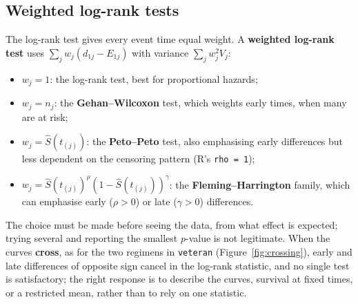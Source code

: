 \documentclass[11pt,a4paper]{article}
\numberwithin{equation}{section}
\theoremstyle{definition}
\begin{document}
\subsection{Weighted log-rank tests}
\label{ssec:weighted}

The log-rank test gives every event time equal weight. A \textbf{weighted log-rank test} uses $\sum_jw_j(d_{1j} - E_{1j})$ with variance $\sum_jw_j^2V_j$:
\begin{itemize}
\item $w_j = 1$: the log-rank test, best for proportional hazards;
\item $w_j = n_j$: the \textbf{Gehan--Wilcoxon} test, which weights early times, when many are at risk;
\item $w_j = \hat S(t_{(j)})$: the \textbf{Peto--Peto} test, also emphasising early differences but less dependent on the censoring pattern (R's \texttt{rho = 1});
\item $w_j = \hat S(t_{(j)})^\rho(1 - \hat S(t_{(j)}))^\gamma$: the \textbf{Fleming--Harrington} family, which can emphasise early ($\rho > 0$) or late ($\gamma > 0$) differences.
\end{itemize}
The choice must be made before seeing the data, from what effect is expected; trying several and reporting the smallest $p$-value is not legitimate. When the curves \textbf{cross}, as for the two regimens in \texttt{veteran} (Figure~\ref{fig:crossing}), early and late differences of opposite sign cancel in the log-rank statistic, and no single test is
satisfactory; the right response is to describe the curves, survival at fixed times, or a restricted mean, rather than to rely on one statistic.
\end{document}
